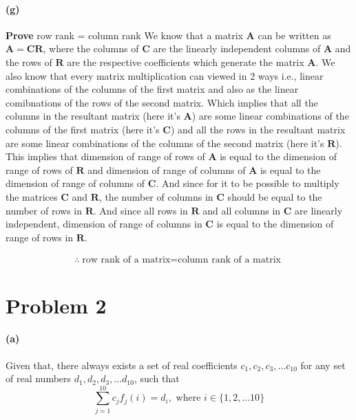 \documentclass[12pt, letterpaper]{article}
\begin{document}
\paragraph{(g)} \textbf{Prove} row rank = column rank
\newline\newline
We know that a matrix $\mathbf{A}$ can be written as $\mathbf{A} = \mathbf{CR}$, where the columns of $\mathbf{C}$ are the linearly independent columns of $\mathbf{A}$ and the rows of $\mathbf{R}$ are the respective coefficients which generate the matrix $\mathbf{A}$. We also know that every matrix multiplication can viewed in 2 ways i.e., linear combinations of the columns of the first matrix and also as the linear comibnations of the rows of the second matrix. Which implies that all the columns in the resultant matrix (here it's $\mathbf{A}$) are some linear combinations of the columns of the first matrix (here it's $\mathbf{C}$) and all the rows in the resultant matrix  are some linear combinations of the columns of the second matrix (here it's $\mathbf{R}$). This implies that dimension of range of rows of $\mathbf{A}$ is equal to the dimension of range of rows of $\mathbf{R}$ and dimension of range of columns of $\mathbf{A}$ is equal to the dimension of range of columns of $\mathbf{C}$. And since for it to be possible to multiply the matrices $\mathbf{C}$ and $\mathbf{R}$, the number of columns in $\mathbf{C}$ should be equal to the number of rows in $\mathbf{R}$. And since all rows in $\mathbf{R}$ and all columns in $\mathbf{C}$ are linearly independent, dimension of range of columns in $\mathbf{C}$ is equal to the dimension of range of rows in $\mathbf{R}$.

\begin{align*}
 \therefore \boxed{\text{row rank of a matrix} = \text{column rank of a matrix}}
\end{align*}

\pagebreak
\section*{Problem 2}
\label{sec:prob2}

\paragraph{(a)}
Given that, there always exists a set of real coefficients $c_1, c_2, c_3, ...c_{10}$ for any set of real numbers $d_1, d_2, d_3, ...d_{10}$, such that
\[
  \sum_{j=1}^{10}c_jf_j(i) = d_i, \text{ where } i \in \{1,2,...10\}
\]
\end{document}
